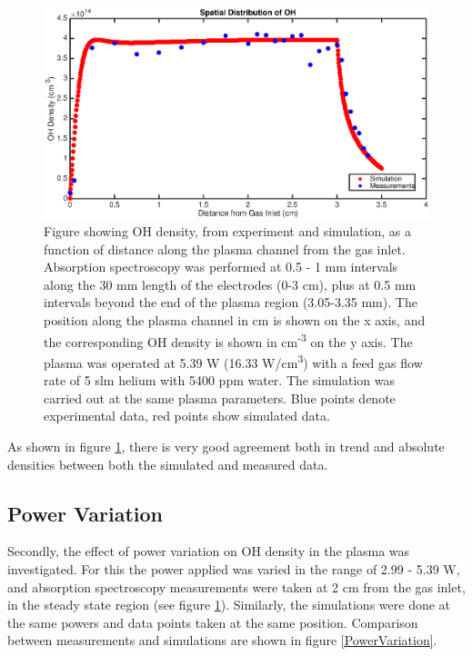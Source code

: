 \documentclass[11pt, oneside]{article}   	%
\begin{document}
\begin{figure}
\includegraphics[width=\textwidth]{Figures/SpatialGraph}
\caption{
Figure showing OH density, from experiment and simulation, as a function of distance along the plasma channel from the gas inlet. Absorption spectroscopy was performed at 0.5 - 1 mm intervals along the 30 mm length of the electrodes (0-3 cm), plus at 0.5 mm intervals beyond the end of the plasma region (3.05-3.35 mm). The position along the plasma channel in cm is shown on the x axis, and the corresponding OH density is shown in cm\textsuperscript{-3} on the y axis. The plasma was operated at 5.39 W (16.33 W/cm\textsuperscript{3}) with a feed gas flow rate of 5 slm helium with 5400 ppm water. 
The simulation was carried out at the same plasma parameters.
Blue points denote experimental data, red points show simulated data.}
\label{SpatialGraph}
\end{figure}

As shown in figure \ref{SpatialGraph}, there is very good agreement both in trend and absolute densities between both the simulated and measured data.

\subsection{Power Variation}

Secondly, the effect of power variation on OH density in the plasma was investigated.
For this the power applied was varied in the range of 2.99 - 5.39 W, and absorption spectroscopy measurements were taken at 2 cm from the gas inlet, in the steady state region (see figure \ref{SpatialGraph}).
Similarly, the simulations were done at the same powers and data points taken at the same position.
Comparison between measurements and simulations are shown in figure \ref{PowerVariation}.
\end{document}
